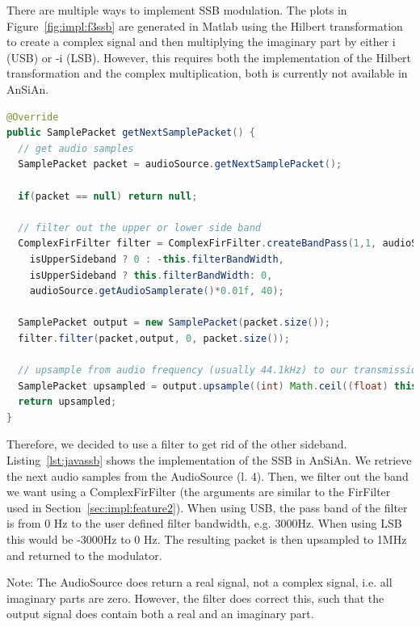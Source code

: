 There are multiple ways to implement SSB modulation. The plots in Figure~\ref{fig:impl:f3ssb} are generated in Matlab using the Hilbert transformation to create a complex signal and then multiplying the imaginary part by either i (USB) or -i (LSB). However, this requires both the implementation of the Hilbert transformation and the complex multiplication, both is currently not available in AnSiAn. 

\begin{lstlisting}[label=lst:javassb, caption=Modulating microphone samples using SSB, language=java,]
@Override
public SamplePacket getNextSamplePacket() {
  // get audio samples
  SamplePacket packet = audioSource.getNextSamplePacket();
	
  if(packet == null) return null;
	
  // filter out the upper or lower side band
  ComplexFirFilter filter = ComplexFirFilter.createBandPass(1,1, audioSource.getAudioSamplerate(),
	isUpperSideband ? 0 : -this.filterBandWidth,
	isUpperSideband ? this.filterBandWidth: 0,
	audioSource.getAudioSamplerate()*0.01f, 40);
	
  SamplePacket output = new SamplePacket(packet.size());
  filter.filter(packet,output, 0, packet.size());
	
  // upsample from audio frequency (usually 44.1kHz) to our transmission frequency (1MHz)
  SamplePacket upsampled = output.upsample((int) Math.ceil((float) this.sampleRate / audioSource.getAudioSamplerate()));
  return upsampled;
}
\end{lstlisting}


Therefore, we decided to use a filter to get rid of the other sideband. Listing~\ref{lst:javassb} shows the implementation of the SSB in AnSiAn. We retrieve the next audio samples from the AudioSource (l. 4). Then, we filter out the band we want using a ComplexFirFilter (the arguments are similar to the FirFilter used in Section~\ref{sec:impl:feature2}). When using USB, the pass band of the filter is from 0 Hz to the user defined filter bandwidth, e.g. 3000Hz. When using LSB this would be -3000Hz to 0 Hz. The resulting packet is then upsampled to 1MHz and returned to the modulator. 

Note: The AudioSource does return a real signal, not a complex signal, i.e. all imaginary parts are zero. However, the filter does correct this, such that the output signal does contain both a real and an imaginary part.

\newpage
